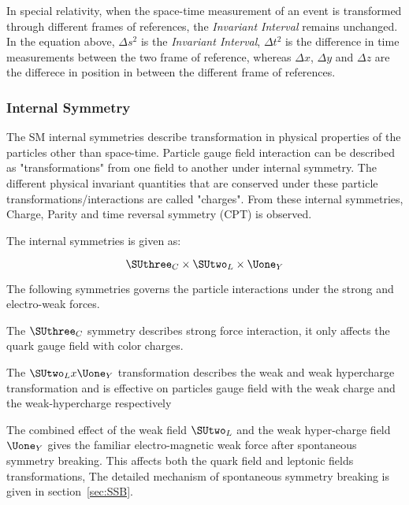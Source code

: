     In special relativity, when the space-time measurement of an event is transformed through different frames of references, the \textit{Invariant Interval} remains unchanged. In the equation above, $\Delta s^{2}$ is the \textit{Invariant Interval}, $\Delta t^{2}$ is the difference in time measurements between the two frame of reference, whereas $\Delta x$, $\Delta y$ and $\Delta z$ are the differece in position in between the different frame of references.

\subsubsection{Internal Symmetry}
The SM internal symmetries describe transformation in physical properties of the particles other than space-time. Particle gauge field interaction can be described as "transformations" from one field to another under internal symmetry. The different physical invariant quantities that are conserved under these particle transformations/interactions are called "charges". From these internal symmetries, Charge, Parity and time reversal symmetry (CPT) is observed. 

The internal symmetries is given as:

    \begin{equation}
        \SUthree_{C} \times  \SUtwo_{L} \times \Uone_{Y}
    \end{equation}


    The following symmetries governs the particle interactions under the strong and electro-weak forces. 
    
    The $\SUthree_{C}$ symmetry describes strong force interaction, it only affects the quark gauge field with color charges. 
    

    The $\SUtwo_{L} x \Uone_{Y}$ transformation describes the weak  and weak hypercharge transformation and is effective on particles gauge field with the weak charge and the weak-hypercharge respectively
    
    The combined effect of the weak field $\SUtwo_{L}$ and the weak hyper-charge field $\Uone_{Y}$ gives the familiar electro-magnetic weak force after spontaneous symmetry breaking. This affects both the quark field and leptonic fields transformations, The detailed mechanism of spontaneous symmetry breaking is given in section~\ref{sec:SSB}.


